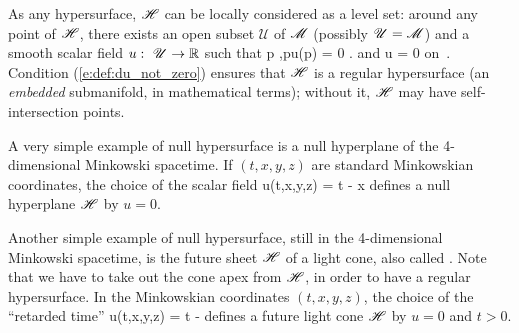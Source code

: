 As any hypersurface, $\mathscr{H}$ can be locally considered as a level set:
around any point of $\mathscr{H}$, there exists an open subset $\mathscr{U}$
of $\mathscr{M}$ (possibly  $\mathscr{U} = \mathscr{M}$) and
a smooth scalar field $u:\ \mathscr{U} \rightarrow \mathbb{R}$ such that
\be \label{e:def:Hor_u_zero}
    \forall p \in {},\quad p\in \Hor \iff u(p) = 0 .
\ee
and
\be \label{e:def:du_not_zero}
    \wnab u \not = 0 \quad \mbox{on}\ \Hor .
\ee
Condition (\ref{e:def:du_not_zero}) ensures that $\mathscr{H}$ is a regular
hypersurface (an \emph{embedded} submanifold, in mathematical terms); without it, $\mathscr{H}$ may have
self-intersection points.

\begin{example} \label{x:def:null_hyp}
A very simple example of null hypersurface is a null hyperplane of
the 4-dimensional Minkowski spacetime. If $(t,x,y,z)$ are standard Minkowskian
coordinates, the choice of the scalar field
\be \label{e:def:null_plane_u}
    u(t,x,y,z) = t - x
\ee
defines a null hyperplane $\mathscr{H}$ by $u=0$.
\end{example}

\begin{example} \label{x:def:light_cone}
Another simple example of null hypersurface, still in the 4-dimensional Minkowski spacetime,
is the future sheet $\mathscr{H}$ of a light cone, also
called . Note that we have
to take out the cone apex from $\mathscr{H}$, in order to have a regular hypersurface.
In the  Minkowskian coordinates $(t,x,y,z)$, the choice of the
``retarded time''
\be \label{e:def:light_cone_u}
    u(t,x,y,z) = t - 
\ee
defines a future light cone $\mathscr{H}$ by $u=0$ and $t>0$.
\end{example}

